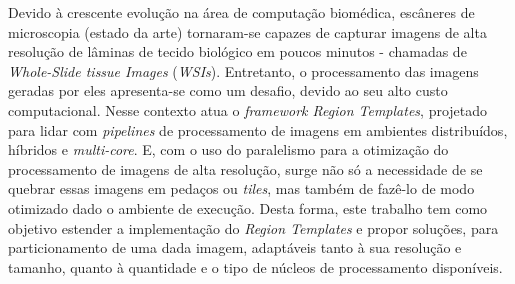 Devido à crescente evolução na área de computação biomédica, escâneres de microscopia (estado da arte) tornaram-se capazes de capturar imagens de alta resolução de lâminas de tecido biológico em poucos minutos - chamadas de \textit{Whole-Slide tissue Images} (\textit{WSIs}). Entretanto, o processamento das imagens geradas por eles apresenta-se como um desafio, devido ao seu alto custo computacional. Nesse contexto atua o \textit{framework Region Templates}, projetado para lidar com \textit{pipelines} de processamento de imagens em ambientes distribuídos, híbridos e \textit{multi-core}. E, com o uso do paralelismo para a otimização do processamento de imagens de alta resolução, surge não só a necessidade de se quebrar essas imagens em pedaços ou \textit{tiles}, mas também de fazê-lo de modo otimizado dado o ambiente de execução. Desta forma, este trabalho tem como objetivo estender a implementação do \textit{Region Templates} e propor soluções, para particionamento de uma dada imagem, adaptáveis tanto à sua resolução e tamanho, quanto à quantidade e o tipo de núcleos de processamento disponíveis.
    
